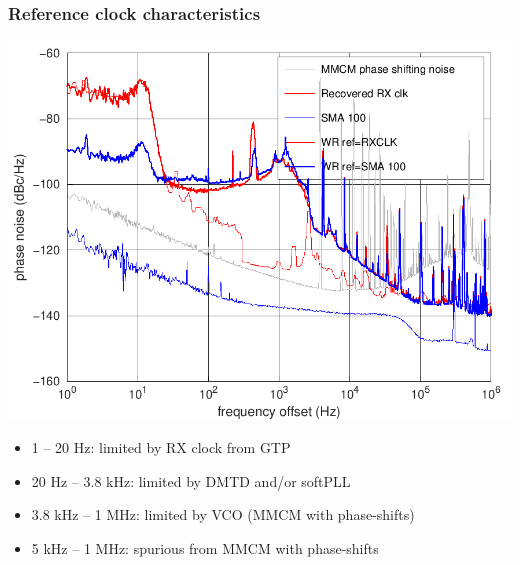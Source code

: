 \documentclass[compress,10pt,aspectratio=169]{beamer}
\begin{document}
\begin{frame}[fragile]\frametitle{Reference clock characteristics}

\begin{minipage}[t]{\linewidth}
\begin{minipage}{.49\linewidth}
\includegraphics[width=\linewidth]{phase_noise.png}
\end{minipage}
\begin{minipage}{.54\linewidth}

\vspace{0.4cm}

  \begin{itemize}
    \item 1 -- 20 Hz: limited by RX clock from GTP
    \item 20 Hz -- 3.8 kHz: limited by DMTD and/or softPLL
    \item 3.8 kHz -- 1 MHz: limited by VCO (MMCM with phase-shifts)
    \item 5 kHz -- 1 MHz: spurious from MMCM with phase-shifts
  \end{itemize}
\end{minipage}
\end{minipage}
\end{frame}
\end{document}
